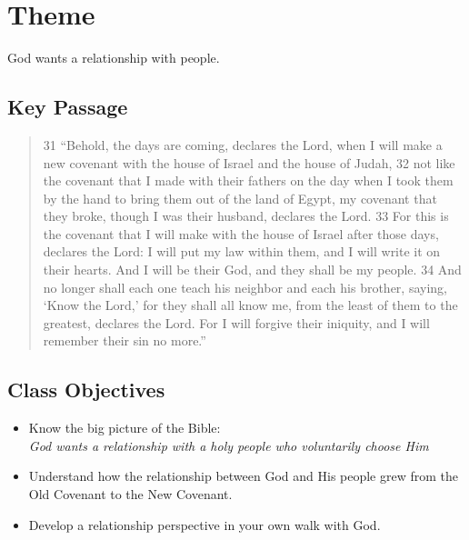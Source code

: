 \chapter{Theme}
\begin{center}
\Large God wants a relationship with people.
\end{center}

\section*{Key Passage}\label{sec:KeyPassage}

\begin{quote}
31 ``Behold, the days are coming, declares the Lord, when I will make a new covenant with the house of Israel and the house of Judah, 32 not like the covenant that I made with their fathers on the day when I took them by the hand to bring them out of the land of Egypt, my covenant that they broke, though I was their husband, declares the Lord. 33 For this is the covenant that I will make with the house of Israel after those days, declares the Lord: I will put my law within them, and I will write it on their hearts. And I will be their God, and they shall be my people. 34 And no longer shall each one teach his neighbor and each his brother, saying, `Know the Lord,' for they shall all know me, from the least of them to the greatest, declares the Lord. For I will forgive their iniquity, and I will remember their sin no more.'' 
\end{quote}

\section*{Class Objectives}\label{sec:ClassObjectives}
\begin{itemize}
\item Know the big picture of the Bible:\\\emph{God wants a relationship with a holy people who voluntarily choose Him}
\item Understand how the relationship between God and His people grew from the Old Covenant to the New Covenant.
\item Develop a relationship perspective in your own walk with God.
\end{itemize}
